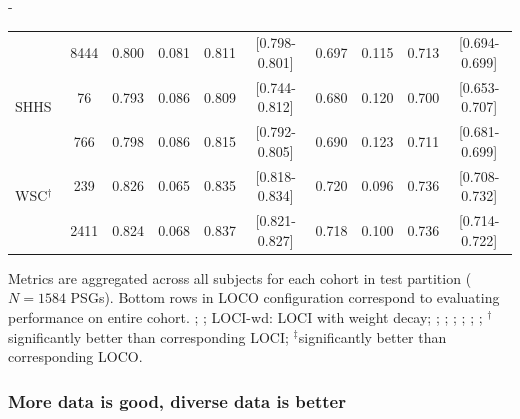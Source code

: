 \begin{table}[tb]
\begin{adjustwidth*}{}{-\marginparsep}
\begin{threeparttable}
\begin{tabular}{@{}lccccccccc@{}}
                 & 8444            & 0.800         & 0.081       & 0.811           & [0.798-0.801]         & 0.697         & 0.115       & 0.713           & [0.694-0.699]         \\
\(\quad\)\acs{SHHS}              & 76              & 0.793         & 0.086       & 0.809           & [0.744-0.812]         & 0.680         & 0.120       & 0.700           & [0.653-0.707]         \\
                 & 766             & 0.798         & 0.086       & 0.815           & [0.792-0.805]         & 0.690         & 0.123       & 0.711           & [0.681-0.699]         \\
\(\quad\)\acs{WSC}\(^{\dagger}\)             & 239             & 0.826         & 0.065       & 0.835           & [0.818-0.834]         & 0.720         & 0.096       & 0.736           & [0.708-0.732]         \\
                 & 2411            & 0.824         & 0.068       & 0.837           & [0.821-0.827]         & 0.718         & 0.100       & 0.736           & [0.714-0.722]         \\ \bottomrule
\end{tabular}
\begin{tablenotes}
\small \item Metrics are aggregated across all subjects for each cohort in test partition (\(N=1584\) \acp{PSG}). 
Bottom rows in \ac{LOCO} configuration correspond to evaluating performance on entire cohort. 
; %
; %
\acs{LOCI}-wd: \acs{LOCI} with weight decay; %
; %
; %
; %
; %
; %
; %
\(^{\dagger}\)significantly better than corresponding \ac{LOCI}; %
\(^{\ddagger}\)significantly better than corresponding \ac{LOCO}.
\end{tablenotes}
\end{threeparttable}
\end{adjustwidth*}
\end{table}

\subsubsection{More data is good, diverse data is better}

